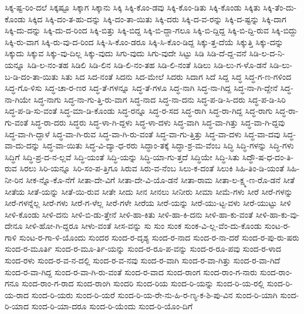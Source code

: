 {ಸಿಕ್ಕ-ಷ್ಟ-ರಿಂ-ದಲೆ
ಸಿಕ್ಕಷ್ಟೂ
ಸಿಕ್ಕಾಗ
ಸಿಕ್ಕಾನು
ಸಿಕ್ಕಿ
ಸಿಕ್ಕಿ-ಕೊಂ-ಡವು
ಸಿಕ್ಕಿ-ಕೊಂ-ಡಿತು
ಸಿಕ್ಕಿ-ಕೊಂಡು
ಸಿಕ್ಕಿತು
ಸಿಕ್ಕಿ-ತೆಂ-ದು-ಕೊಂಡು
ಸಿಕ್ಕಿದ
ಸಿಕ್ಕಿ-ದಂ-ತ-ಹು-ದನ್ನು
ಸಿಕ್ಕಿ-ದಂ-ತಾ-ಯಿತು
ಸಿಕ್ಕಿ-ದರು
ಸಿಕ್ಕಿ-ದ-ವ-ರನ್ನು
ಸಿಕ್ಕಿ-ದ-ಷ್ಟನ್ನು
ಸಿಕ್ಕಿ-ದಾಗ
ಸಿಕ್ಕಿ-ದು-ದನ್ನು
ಸಿಕ್ಕಿ-ದು-ದ-ರಿಂದ
ಸಿಕ್ಕಿ-ಬಿತ್ತು
ಸಿಕ್ಕಿ-ಬಿದ್ದ
ಸಿಕ್ಕಿ-ಬಿ-ದ್ದಾ-ಗಲೂ
ಸಿಕ್ಕಿ-ಬಿ-ದ್ದಿದ್ದ
ಸಿಕ್ಕಿ-ಬಿ-ದ್ದಿ-ರುವ
ಸಿಕ್ಕಿ-ಬಿದ್ದು
ಸಿಕ್ಕಿ-ರು-ವಾಗ
ಸಿಕ್ಕಿ-ರು-ವು-ದ-ರಿಂದ
ಸಿಕ್ಕಿ-ಸಿ-ಕೊಂ-ಡರೂ
ಸಿಕ್ಕಿ-ಸಿ-ಕೊಂ-ಡಿದ್ದ
ಸಿಕ್ಕು-ತ್ತ-ದೆಯೆ
ಸಿಕ್ಕುತ್ತಿ
ಸಿಕ್ಕು-ದನ್ನು
ಸಿಕ್ಕುದು
ಸಿಕ್ಕುವ
ಸಿಕ್ಕು-ವು-ದಿಲ್ಲ
ಸಿಕ್ಕು-ವುದು
ಸಿಗು-ವುದು
ಸಿಗು-ವುದೇ
ಸಿಟ್ಟು
ಸಿಡಿ
ಸಿಡಿ-ದೆ-ದ್ದ-ವನೆ
ಸಿಡಿ-ಲ-ದ-ನಿ-ಯನ್ನೂ
ಸಿಡಿ-ಲ-ನಂ-ತಹ
ಸಿಡಿಲಿ
ಸಿಡಿ-ಲಿನ
ಸಿಡಿ-ಲಿ-ನಂ-ತಹ
ಸಿಡಿ-ಲಿ-ನಂತೆ
ಸಿಡಿಲು
ಸಿಡಿ-ಲು-ಗ-ಳೊ-ಡನೆ
ಸಿಡಿ-ಲು-ಬ-ಡಿ-ದಂ-ತಾ-ಯಿತು
ಸಿತು
ಸಿದ
ಸಿದ-ನಂತೆ
ಸಿದನು
ಸಿದ-ಮೇಲೆ
ಸಿದರು
ಸಿದಾಗ
ಸಿದೆ
ಸಿದ್ದ
ಸಿದ್ಧ
ಸಿದ್ಧ-ಗ-ಣ-ಗಳಿಂದ
ಸಿದ್ಧ-ಗೊ-ಳಿಸು
ಸಿದ್ಧ-ಚಾ-ರ-ಣರ
ಸಿದ್ಧ-ತೆ-ಗಳನ್ನೂ
ಸಿದ್ಧ-ತೆ-ಗಳೂ
ಸಿದ್ಧ-ನಾಗಿ
ಸಿದ್ಧ-ನಾ-ಗಿದ್ದ
ಸಿದ್ಧ-ನಾ-ಗಿ-ದ್ದೇನೆ
ಸಿದ್ಧ-ನಾ-ಗಿಯೇ
ಸಿದ್ಧ-ನಾಗು
ಸಿದ್ಧ-ನಾ-ಗು-ತ್ತಿ-ರು-ವಾಗ
ಸಿದ್ಧ-ನಾದ
ಸಿದ್ಧ-ನಾ-ದನು
ಸಿದ್ಧ-ಪ-ಡಿ-ಸಿ-ದರು
ಸಿದ್ಧ-ಪ-ಡಿ-ಸಿರಿ
ಸಿದ್ಧ-ಪ-ಡಿ-ಸು-ವಂತೆ
ಸಿದ್ಧ-ಮಾ-ಡಿ-ಕೊಂಡು
ಸಿದ್ಧ-ರನ್ನೂ
ಸಿದ್ಧ-ರ-ಸದ
ಸಿದ್ಧ-ರಾಗಿ
ಸಿದ್ಧ-ರಾ-ಗಿದ್ದ
ಸಿದ್ಧ-ರಾಗು
ಸಿದ್ಧ-ರಾ-ಗು-ವಂತೆ
ಸಿದ್ಧ-ರಾ-ದರು
ಸಿದ್ಧರು
ಸಿದ್ಧ-ಳಾ-ಗಿ-ದ್ದಳು
ಸಿದ್ಧ-ಳಾ-ದಳು
ಸಿದ್ಧ-ವಾಗಿ
ಸಿದ್ಧ-ವಾ-ಗಿತ್ತು
ಸಿದ್ಧ-ವಾ-ಗಿ-ದ್ದವು
ಸಿದ್ಧ-ವಾ-ಗಿ-ದ್ದಾಳೆ
ಸಿದ್ಧ-ವಾ-ಗಿ-ರುವ
ಸಿದ್ಧ-ವಾ-ಗಿ-ರು-ವಂತೆ
ಸಿದ್ಧ-ವಾ-ಗು-ತ್ತಿತ್ತು
ಸಿದ್ಧ-ವಾ-ದಳು
ಸಿದ್ಧ-ವಾ-ದವು
ಸಿದ್ಧ-ವಾ-ದು-ದನ್ನು
ಸಿದ್ಧ-ವಾ-ಯಿತು
ಸಿದ್ಧ-ವಿ-ದ್ಯಾ-ಧ-ರರು
ಸಿದ್ಧಾಂ-ತಕ್ಕೆ
ಸಿದ್ಧಾ-ಶ್ರ-ಮ-ವೆಂಬ
ಸಿದ್ಧಿ
ಸಿದ್ಧಿ-ಗಳನ್ನು
ಸಿದ್ಧಿ-ಗಳು
ಸಿದ್ಧಿಗೆ
ಸಿದ್ಧಿ-ಪ್ರ-ದ-ನ-ಲ್ಲವೆ
ಸಿದ್ಧಿ-ಯಂತೆ
ಸಿದ್ಧಿ-ಯನ್ನು
ಸಿದ್ಧಿ-ಯಾ-ಗು-ತ್ತದೆ
ಸಿದ್ಧಿಯೇ
ಸಿದ್ಧಿ-ಸಿತು
ಸಿದ್ಧೌ-ಷ-ಧ-ದಂ-ತಿ-ರುವ
ಸಿರಲು
ಸಿರಿ-ಯನ್ನೂ
ಸಿರಿ-ಸಂ-ಪ-ತ್ತಿಗೂ
ಸಿರುವ
ಸಿರು-ವ-ನೆಂಬ
ಸಿಲು-ಕ-ದಂತೆ
ಸಿಲುಕಿ
ಸಿಹಿ-ತಿಂ-ಡಿ-ಯಂತೆ
ಸಿಹಿ-ನೀ-ರಿನ
ಸೀಕ-ನ್ನೊ-ಕೊ-ನೆಗೆ
ಸೀತಾ-ದೇ-ವಿಗೆ
ಸೀತಾ-ದೇ-ವಿ-ಯೊ-ಡನೆ
ಸೀತಾ-ರಾಮ
ಸೀತಾ-ಲ-ಕ್ಷ್ಮ-ಣ-ರೊ-ಡನೆ
ಸೀತೆ
ಸೀತೆಯ
ಸೀತೆ-ಯನ್ನು
ಸೀತೆ-ಯಿ-ರುವ
ಸೀತೇ
ಸೀದು
ಸೀನ
ಸೀನಲು
ಸೀನೀರು
ಸೀಮಾ
ಸೀಮೆ-ಗಳು
ಸೀರೆ
ಸೀರೆ-ಗಳನ್ನು
ಸೀರೆ-ಗಳನ್ನೆಲ್ಲ
ಸೀರೆ-ಗಳು
ಸೀರೆ-ಗ-ಳೆಲ್ಲ
ಸೀರೆ-ಗಳೇ
ಸೀರೆಯ
ಸೀರೆ-ಯನ್ನು
ಸೀರೆ-ಯು-ಟ್ಟ-ವಳು
ಸೀರೆ-ಯುಟ್ಟು
ಸೀಳಿ
ಸೀಳಿ-ಕೊಂಡು
ಸೀಳಿ-ದನು
ಸೀಳಿ-ಬಿ-ಡು-ತ್ತೇನೆ
ಸೀಳಿ-ಹಾ-ಕಿತು
ಸೀಳಿ-ಹಾ-ಕಿ-ದನು
ಸೀಳಿ-ಹಾ-ಕು-ವಂತೆ
ಸೀಳಿ-ಹಾ-ಕು-ವು-ದೇನೂ
ಸೀಳಿ-ಹೋ-ಗಿ-ದ್ದರೂ
ಸೀಳು-ವಂತೆ
ಸೀಸ-ವನ್ನು
ಸು
ಸುಂ
ಸುಂಕ
ಸುಂಕ-ವಿ-ಲ್ಲ-ವೆಂ-ದು-ಕೊಂಡು
ಸುಂಟ-ರ-ಗಾಳಿ
ಸುಂಟ-ರ-ಗಾ-ಳಿ-ಯೊಂದು
ಸುಂದರ
ಸುಂದ-ರ-ದೃಶ್ಯ
ಸುಂದ-ರ-ನಾದ
ಸುಂದ-ರ-ನಾ-ದರೆ
ಸುಂದ-ರ-ಪು-ರು-ಷರು
ಸುಂದ-ರ-ಮೂರ್ತಿ
ಸುಂದ-ರ-ಮೂ-ರ್ತಿ-ಯನ್ನು
ಸುಂದ-ರ-ರೂ-ಪ-ವನ್ನು
ಸುಂದ-ರ-ರೂ-ಪವು
ಸುಂದ-ರ-ಳಾದ
ಸುಂದ-ರಳು
ಸುಂದ-ರ-ವ-ನ-ದಲ್ಲಿ
ಸುಂದ-ರ-ವ-ನವು
ಸುಂದ-ರ-ವಾಗಿ
ಸುಂದ-ರ-ವಾ-ಗಿತ್ತು
ಸುಂದ-ರ-ವಾ-ಗಿದೆ
ಸುಂದ-ರ-ವಾ-ಗಿದ್ದ
ಸುಂದ-ರ-ವಾ-ಗಿ-ರು-ವಂತೆ
ಸುಂದ-ರ-ವಾದ
ಸುಂದ-ರಾಂಗ
ಸುಂದ-ರಾಂ-ಗ-ನಾರು
ಸುಂದ-ರಾಂ-ಗನೂ
ಸುಂದ-ರಾಂ-ಗ-ರಾದ
ಸುಂದ-ರಾಂಗಿ
ಸುಂದರಿ
ಸುಂದ-ರಿಯ
ಸುಂದ-ರಿ-ಯನ್ನು
ಸುಂದ-ರಿ-ಯ-ರಲ್ಲಿ
ಸುಂದ-ರಿ-ಯ-ರಾದ
ಸುಂದ-ರಿ-ಯರು
ಸುಂದ-ರಿ-ಯರೆ
ಸುಂದ-ರಿ-ಯ-ರೇ-ನು-ಹಿ-ರ-ಣ್ಯ-ಕ-ಶಿ-ಪು-ವಿನ
ಸುಂದ-ರಿ-ಯಾಗಿ
ಸುಂದ-ರಿ-ಯಾದ
ಸುಂದ-ರಿ-ಯಾ-ದರೂ
ಸುಂದ-ರಿ-ಯೆಂದು
ಸುಂದ-ರಿ-ಯೊಂ-ದಿಗೆ
}
